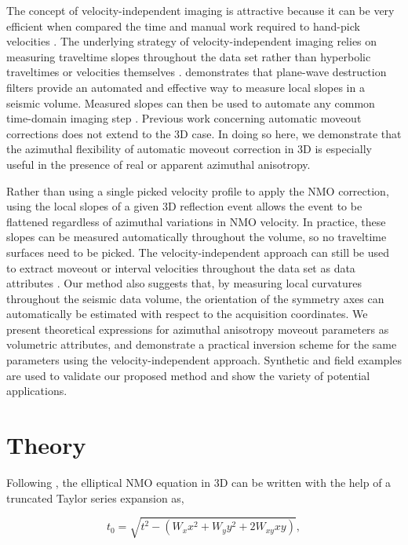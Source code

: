 The concept of velocity-independent imaging \cite[]{Ottolini.sep.37.59} is attractive because it can be very efficient when compared the time and manual work required to hand-pick velocities \cite[]{fomel07}.  The underlying strategy of velocity-independent imaging relies on measuring traveltime slopes throughout the data set rather than hyperbolic traveltimes or velocities themselves \cite[]{SEG-2004-24232426}.  \cite{GEO67-06-19461960} demonstrates that plane-wave destruction filters provide an automated and effective way to measure local slopes in a seismic volume.  Measured slopes can then be used to automate any common time-domain imaging step \cite[]{fomel07}.  Previous work concerning automatic moveout corrections does not extend to the 3D case.  In doing so here, we demonstrate that the azimuthal flexibility of automatic moveout correction in 3D is especially useful in the presence of real or apparent azimuthal anisotropy.  

Rather than using a single picked velocity profile to apply the NMO correction, using the local slopes of a given 3D reflection event allows the event to be flattened regardless of azimuthal variations in NMO velocity.  In practice, these slopes can be measured automatically throughout the volume, so no traveltime surfaces need to be picked.  The velocity-independent approach can still be used to extract moveout or interval velocities throughout the data set as data attributes \cite[]{fomel07}.  Our method also suggests that, by measuring local curvatures throughout the seismic data volume, the orientation of the symmetry axes can automatically be estimated with respect to the acquisition coordinates. We present theoretical expressions for azimuthal anisotropy moveout parameters as volumetric attributes, and demonstrate a practical inversion scheme for the same parameters using the velocity-independent approach. Synthetic and field examples are used to validate our proposed method and show the variety of potential applications.

\section{Theory}
Following \cite[]{GEO63-03-10791092}, the elliptical NMO equation in 3D can be written with the help of a truncated Taylor series expansion as,

\begin{equation}
\label{eq:NMO}
t_0=\sqrt{t^2-\left(W_xx^2+W_yy^2+2W_{xy}xy\right)},  
\end{equation}

